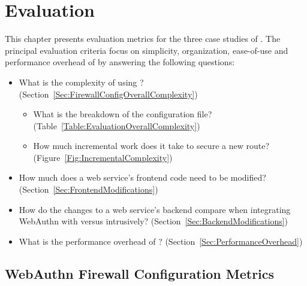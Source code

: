 
\chapter{Evaluation}\label{Chap:Evaluation}


This chapter presents evaluation metrics for the three case studies of \sys{}. The principal evaluation criteria focus on simplicity, organization, ease-of-use and performance overhead of \sys{} by answering the following questions:

\begin{itemize}[nosep]
\item What is the complexity of using \sys{}? (Section~\ref{Sec:FirewallConfigOverallComplexity})

  \begin{itemize}[nosep]
    \item What is the breakdown of the configuration file? (Table~\ref{Table:EvaluationOverallComplexity})
    \item How much incremental work does it take to secure a new route? (Figure~\ref{Fig:IncrementalComplexity})
  \end{itemize}

\item How much does a web service's frontend code need to be modified? (Section~\ref{Sec:FrontendModifications})

\item How do the changes to a web service's backend compare when integrating WebAuthn with \sys{} versus intrusively? (Section~\ref{Sec:BackendModifications})

\item What is the performance overhead of \sys{}? (Section~\ref{Sec:PerformanceOverhead})

\end{itemize}



\section{WebAuthn Firewall Configuration Metrics}

